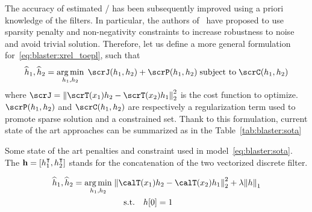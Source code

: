 \mynewline
The accuracy of estimated \RIRs/ has been subsequently improved using a priori knowledge of the filters.
In particular, the authors of~ have proposed to use sparsity penalty and non-negativity constraints to increase robustness to noise and avoid trivial solution.
Therefore, let us define a more general formulation for~\cref{eq:blaster:xrel_toepl}, such that
\begin{equation}\label{eq:blaster:sota}
    \disFilterHat_1, \disFilterHat_2
    =
    \kargmin_{\disFilter_1, \disFilter_2}
    \;
    \scrJ(\disFilter_1, \disFilter_2) + \scrP(\disFilter_1, \disFilter_2)
    \;\text{subject to}\;
    \scrC(\disFilter_1, \disFilter_2)
\end{equation}
where $\scrJ = \kvvbar{\scrT(\disRecordedSignal_1) \disFilter_2 - \scrT(\disRecordedSignal_2) \disFilter_1}_2^2$ is the cost function to optimize.
$\scrP(\disFilter_1, \disFilter_2)$ and $\scrC(\disFilter_1, \disFilter_2)$ are respectively a regularization term used to promote sparse solution and a constrained set.
Thank to this formulation, current state of the art approaches can be summarized as in the Table~\cref{tab:blaster:sota}

\begin{table}[!h]

    \begin{fullwidth}
        \centering
        

        \caption{Some state of the art penalties and constraint used in model~\cref{eq:blaster:sota}.
            The $\mathbf{h} = \klist{h_1^\intercal, h_2^\intercal}$ stands for the concatenation of the two vectorized discrete filter.}
        \label{tab:blaster:sota}
    \end{fullwidth}
\end{table}

\begin{multline}
    \label{eq:xrel_toepl}
    \disFilterHat_1, \disFilterHat_2
    =
    \kargmin_{\disFilter_1, \disFilter_2}
    \;
    \kvvbar{
        \calT(\disRecordedSignal_1) \disFilter_2
        -
        \calT(\disRecordedSignal_2) \disFilter_1
    }_2^2
    +
    \lambda
    \kvvbar{
        \disFilter
    }_1
    \\
    \text{s.t.} \quad \disFilter[0] = 1
    \qquad
\end{multline}


